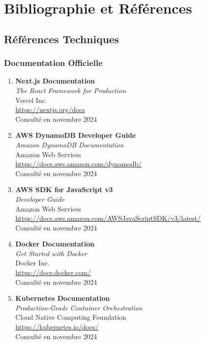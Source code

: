 \chapter{Bibliographie et Références}

\section{Références Techniques}

\subsection{Documentation Officielle}

\begin{enumerate}
    \item \textbf{Next.js Documentation} \\
    \textit{The React Framework for Production} \\
    Vercel Inc. \\
    \url{https://nextjs.org/docs} \\
    Consulté en novembre 2024

    \item \textbf{AWS DynamoDB Developer Guide} \\
    \textit{Amazon DynamoDB Documentation} \\
    Amazon Web Services \\
    \url{https://docs.aws.amazon.com/dynamodb/} \\
    Consulté en novembre 2024

    \item \textbf{AWS SDK for JavaScript v3} \\
    \textit{Developer Guide} \\
    Amazon Web Services \\
    \url{https://docs.aws.amazon.com/AWSJavaScriptSDK/v3/latest/} \\
    Consulté en novembre 2024

    \item \textbf{Docker Documentation} \\
    \textit{Get Started with Docker} \\
    Docker Inc. \\
    \url{https://docs.docker.com/} \\
    Consulté en novembre 2024

    \item \textbf{Kubernetes Documentation} \\
    \textit{Production-Grade Container Orchestration} \\
    Cloud Native Computing Foundation \\
    \url{https://kubernetes.io/docs/} \\
    Consulté en novembre 2024


\end{enumerate}

